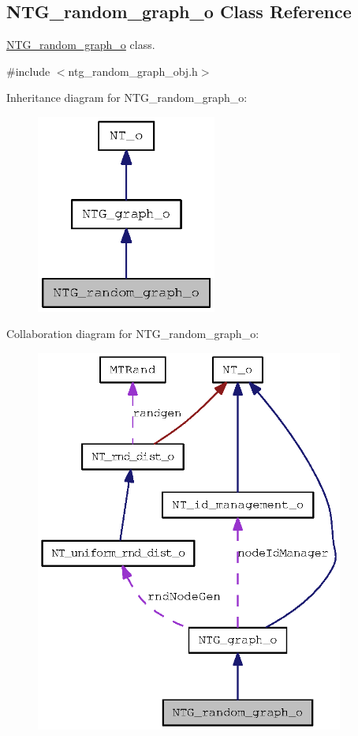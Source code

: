 \subsection{NTG\_\-random\_\-graph\_\-o Class Reference}
\label{class_n_t_g__random__graph__o}


\hyperlink{class_n_t_g__random__graph__o}{NTG\_\-random\_\-graph\_\-o} class.  




{\ttfamily \#include $<$ntg\_\-random\_\-graph\_\-obj.h$>$}



Inheritance diagram for NTG\_\-random\_\-graph\_\-o:
\nopagebreak
\begin{figure}[H]
\begin{center}
\leavevmode
\includegraphics[width=168pt]{class_n_t_g__random__graph__o__inherit__graph}
\end{center}
\end{figure}


Collaboration diagram for NTG\_\-random\_\-graph\_\-o:
\nopagebreak
\begin{figure}[H]
\begin{center}
\leavevmode
\includegraphics[width=287pt]{class_n_t_g__random__graph__o__coll__graph}
\end{center}
\end{figure}
